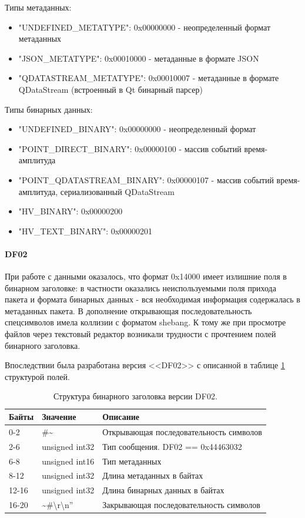 \documentclass[a4paper,14pt]{extreport}
\begin{document}
Типы метаданных:
\begin{itemize}
    \item "UNDEFINED\_METATYPE": 0x00000000 - неопределенный формат метаданных
    \item "JSON\_METATYPE": 0x00010000 - метаданные в формате JSON
    \item "QDATASTREAM\_METATYPE": 0x00010007 - метаданные в формате QDataStream (встроенный в Qt бинарный парсер)
\end{itemize}
Типы бинарных данных:
\begin{itemize}
    \item "UNDEFINED\_BINARY": 0x00000000 - неопределенный формат
    \item "POINT\_DIRECT\_BINARY": 0x00000100 - массив событий время-амплитуда
    \item "POINT\_QDATASTREAM\_BINARY": 0x00000107 - массив событий время-амплитуда, сериализованный QDataStream
    \item "HV\_BINARY": 0x00000200
    \item "HV\_TEXT\_BINARY": 0x00000201
\end{itemize}

\paragraph{DF02}
При работе с данными оказалось, что формат 0x14000 имеет излишние поля в бинарном заголовке: в частности оказались неиспользуемыми поля прихода пакета и формата бинарных данных - вся необходимая информация содержалась в метаданных пакета. В дополнение открывающая последовательность спецсимволов имела коллизии с форматом shebang\cite{wiki:Shebang_Unix}. К тому же при просмотре файлов через текстовый редактор возникали трудности с прочтением полей бинарного заголовка.

Впоследствии была разработана версия <<DF02>> с описанной в таблице \ref{tab:df02-binary-structure} структурой полей.

\begin{table}
    \centering
    \begin{tabular}{|l|l|l|}
        \hline
        Байты & Значение & Описание \\
        \hline
        0-2 & \#\textasciitilde & Открывающая последовательность символов \\
        \hline
        2-6 & unsigned int32 & Тип сообщения. DF02 == 0x44463032 \\
        \hline
        6-8 & unsigned int16 & Тип метаданных \\
        \hline
        8-12 & unsigned int32 & Длина метаданных в байтах \\
        \hline
        12-16 & unsigned int32 & Длина бинарных данных в байтах \\
        \hline
        16-20 & \textasciitilde\#\textbackslash r\textbackslash n” & Закрывающая последовательность символов \\
        \hline
    \end{tabular} 
    \caption{Структура бинарного заголовка версии DF02.}
    \label{tab:df02-binary-structure}
\end{table}
\end{document}
